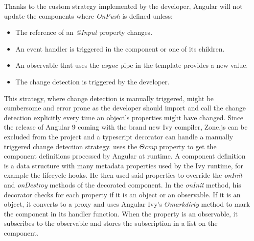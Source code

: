 Thanks to the custom strategy implemented by the developer, Angular will not update the components where \emph{OnPush} is defined unless:
\begin{itemize}
	\item The reference of an \emph{@Input} property changes.
	\item An event handler is triggered in the component or one of its children.
	\item An observable that uses the \emph{async} pipe in the template provides a new value.
	\item The change detection is triggered by the developer.
\end{itemize} \medskip
This strategy, where change detection is manually triggered, might be cumbersome and error prone as the developer should import and call the change detection explicitly every time an object's properties might have changed.
Since the release of Angular 9 coming with the brand new Ivy compiler, Zone.js can be excluded from the project and a typescript decorator can handle a manually triggered change detection strategy.
\textcite{Buomprisco2019} uses the \emph{\(\Theta\)cmp} property to get the component definitions processed by Angular at runtime. A component definition is a data structure with many metadata properties used by the Ivy runtime, for example the lifecycle hooks. \autocite{BrinkNielsen2019}  He then used said properties to override the \emph{onInit} and \emph{onDestroy} methods of the decorated component.
In the \emph{onInit} method, his decorator checks for each property if it is an object or an observable. If it is an object, it converts to a proxy and uses Angular Ivy's \emph{\(\Theta\)markdirty} method to mark the component in its handler function. When the property is an observable, it subscribes to the observable and stores the subscription in a list on the component.


